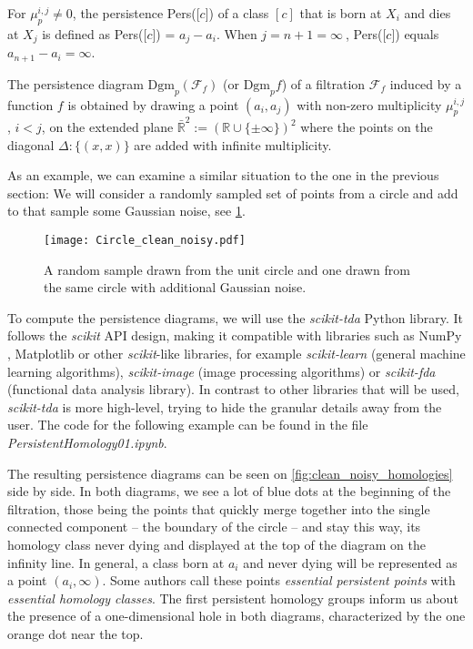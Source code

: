 \begin{definition}
For $\mu^{i,j}_{p} \ne 0$, the persistence Pers([$c$]) of a class $[c]$ that is born at $X_{i}$ and dies at $X_{j}$ is defined as Pers([$c$]) = $a_{j} - a_{i}$. When $j=n+1 = \infty\:$, Pers([$c$]) equals $a_{n+1} - a_{i} = \infty$.
\end{definition}

\begin{definition}
  The persistence diagram $\text{Dgm}_{p}(\mathcal{F}_{f})$ (or $\text{Dgm}_{p}f$) of a filtration $\mathcal{F}_{f}$ induced by a function $f$ is obtained by drawing a point $(a_{i}, a_{j})$ with non-zero multiplicity $\mu^{i,j}_{p}$, $i < j$, on the extended plane $\bar{\mathbb{R}}^{2} := (\mathbb{R} \cup \{\pm \infty\})^{2}$ where the points on the diagonal $\Delta: \{(x,x)\}$ are added with infinite multiplicity.
\end{definition}

As an example, we can examine a similar situation to the one in the previous section: We will consider a randomly sampled set of points from a circle and add to that sample some Gaussian noise, see \ref{fig:noisy_clean_circles}.

\begin{figure}[h!]
  \centering
  \texttt{[image: Circle\_clean\_noisy.pdf]}
  \caption{A random sample drawn from the unit circle and one drawn from the same circle with additional Gaussian noise.}
  \label{fig:noisy_clean_circles}
\end{figure}

To compute the persistence diagrams, we will use the \textit{scikit-tda} \cite{scikittda2019} Python library. It follows the \textit{scikit} API design, making it compatible with libraries such as NumPy \cite{harris2020array}, Matplotlib \cite{Hunter:2007} or other \textit{scikit}-like libraries, for example \textit{scikit-learn} \cite{scikit-learn} (general machine learning algorithms), \textit{scikit-image} \cite{van2014scikit} (image processing algorithms) or \textit{scikit-fda} \cite{ramos-carreno++_2024_scikit-fda} (functional data analysis library). In contrast to other libraries that will be used, \textit{scikit-tda} is more high-level, trying to hide the granular details away from the user. The code for the following example can be found in the file \textit{PersistentHomology01.ipynb}.

\par
The resulting persistence diagrams can be seen on \ref{fig:clean_noisy_homologies} side by side. In both diagrams, we see a lot of blue dots at the beginning of the filtration, those being the points that quickly merge together into the single connected component -- the boundary of the circle -- and stay this way, its homology class never dying and displayed at the top of the diagram on the infinity line. In general, a class born at $a_{i}$ and never dying will be represented as a point $(a_{i}, \infty)$. Some authors call these points \textit{essential persistent points} with \textit{essential homology classes}. The first persistent homology groups inform us about the presence of a one-dimensional hole in both diagrams, characterized by the one orange dot near the top.

